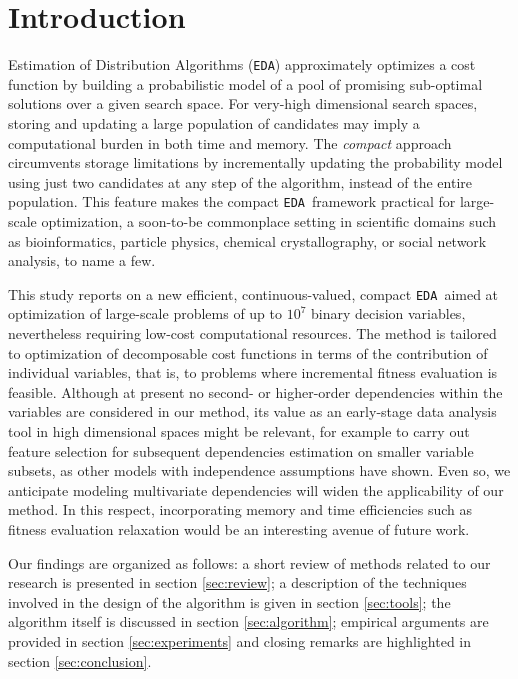 \documentclass{sig-alternate}
\newcommand{\EDA}{\texttt{EDA}}
\begin{document}
\section{Introduction}
Estimation of Distribution Algorithms (\EDA) \cite{Larranaga01, Pelikan06} approximately optimizes a cost function by building a probabilistic model of a pool of promising sub-optimal solutions over a given search space. For very-high dimensional search spaces, storing and updating a large population of candidates may imply a computational burden in both time and memory. The \emph{compact} approach circumvents storage limitations by incrementally updating the probability model using just two candidates at any step of the algorithm, instead of the entire population. This feature makes the compact \EDA~framework practical for large-scale optimization, a soon-to-be commonplace setting in scientific domains such as bioinformatics, particle physics, chemical crystallography, or social network analysis, to name a few.

This study reports on a new efficient, continuous-valued, compact \EDA~aimed at optimization of large-scale problems of up to $10^7$ binary decision variables, nevertheless requiring low-cost computational resources. The method is tailored to optimization of decomposable cost functions in terms of the contribution of individual variables, that is, to problems where incremental fitness evaluation is feasible. Although at present no second- or higher-order dependencies within the variables are considered in our method, its value as an early-stage data analysis tool in high dimensional spaces might be relevant, for example to carry out feature selection for subsequent dependencies estimation on smaller variable subsets, as other models with independence assumptions have shown\cite{Rojas08}. Even so, we anticipate modeling multivariate dependencies will widen the applicability of our method. In this respect, incorporating memory and time efficiencies such as fitness evaluation relaxation\cite{Sastry02} would be an interesting avenue of future work.   

Our findings are organized as follows: a short review of methods related to our research is presented in section \ref{sec:review}; a description of the techniques involved in the design of the algorithm is given in section \ref{sec:tools}; the algorithm itself is discussed in section \ref{sec:algorithm}; empirical arguments are provided in section \ref{sec:experiments} and closing remarks are highlighted in section \ref{sec:conclusion}.
\end{document}
